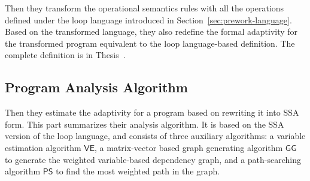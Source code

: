 Then they transform the operational semantics rules with all the operations defined under the loop language introduced in Section~\ref{sec:prework-language}.
Based on the transformed language, they also redefine the formal adaptivity for the transformed program equivalent to the
loop language-based definition. The complete definition is in Thesis~\cite{weihao22}.
%
\subsection{Program Analysis Algorithm}
Then they estimate the adaptivity for a program based on rewriting it into SSA form.
This part summarizes
their analysis algorithm.
It is based on the SSA version of the loop language, and
consists of three auxiliary algorithms:
a variable estimation algorithm $\mathsf{VE}$, a matrix-vector based graph generating algorithm $\mathsf{GG}$ to generate the weighted variable-based dependency graph, and a path-searching algorithm $\mathsf{PS}$ to find the most weighted path in the graph.
%
